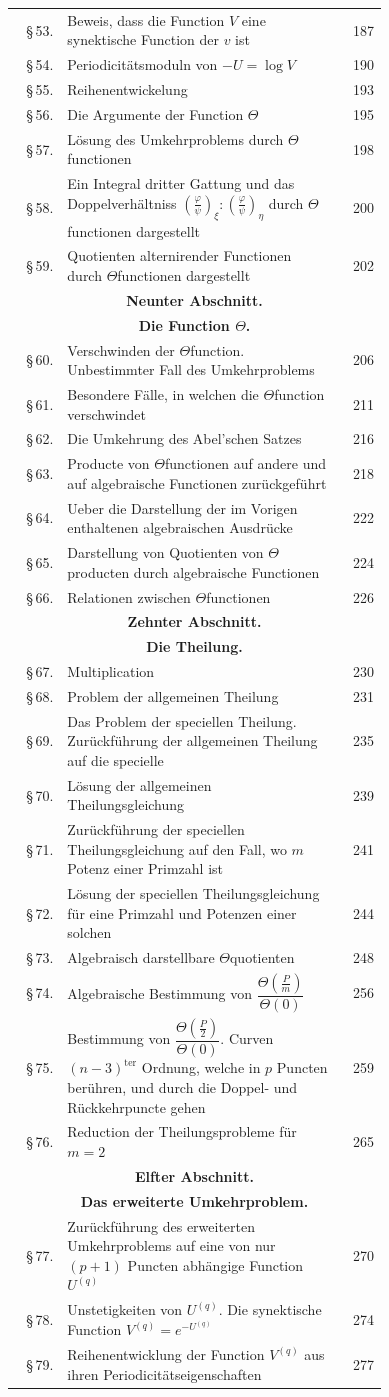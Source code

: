 \documentclass[10pt]{article}
\newcommand{\tocentry}[3]{\S\,#1 & #2 & #3\\}
\newcommand{\tocsec}[2]{\multicolumn{3}{c}{\bfseries #1}\\[-0.15em]\multicolumn{3}{c}{\bfseries #2}\\[0.25em]}
\begin{document}
{\begin{longtable}{@{}r@{\ }p{0.74\linewidth}@{\ }r@{}}
\tocentry{53.}{Beweis, dass die Function $V$ eine synektische Function der $v$ ist}{187}
\tocentry{54.}{Periodicitätsmoduln von $-U=\log V$}{190}
\tocentry{55.}{Reihenentwickelung}{193}
\tocentry{56.}{Die Argumente der Function $\Theta$}{195}
\tocentry{57.}{Lösung des Umkehrproblems durch $\Theta$functionen}{198}
\tocentry{58.}{Ein Integral dritter Gattung und das Doppelverhältniss $\left(\frac{\varphi}{\psi}\right)_{\xi}:\left(\frac{\varphi}{\psi}\right)_{\eta}$ durch $\Theta$functionen dargestellt}{200}
\tocentry{59.}{Quotienten alternirender Functionen durch $\Theta$functionen dargestellt}{202}
\tocsec{Neunter Abschnitt.}{Die Function $\Theta$.}
\tocentry{60.}{Verschwinden der $\Theta$function. Unbestimmter Fall des Umkehrproblems}{206}
\tocentry{61.}{Besondere Fälle, in welchen die $\Theta$function verschwindet}{211}
\tocentry{62.}{Die Umkehrung des Abel'schen Satzes}{216}
\tocentry{63.}{Producte von $\Theta$functionen auf andere und auf algebraische Functionen zurückgeführt}{218}
\tocentry{64.}{Ueber die Darstellung der im Vorigen enthaltenen algebraischen Ausdrücke}{222}
\tocentry{65.}{Darstellung von Quotienten von $\Theta$producten durch algebraische Functionen}{224}
\tocentry{66.}{Relationen zwischen $\Theta$functionen}{226}
\tocsec{Zehnter Abschnitt.}{Die Theilung.}
\tocentry{67.}{Multiplication}{230}
\tocentry{68.}{Problem der allgemeinen Theilung}{231}
\tocentry{69.}{Das Problem der speciellen Theilung. Zurückführung der allgemeinen Theilung auf die specielle}{235}
\tocentry{70.}{Lösung der allgemeinen Theilungsgleichung}{239}
\tocentry{71.}{Zurückführung der speciellen Theilungsgleichung auf den Fall, wo $m$ Potenz einer Primzahl ist}{241}
\tocentry{72.}{Lösung der speciellen Theilungsgleichung für eine Primzahl und Potenzen einer solchen}{244}
\tocentry{73.}{Algebraisch darstellbare $\Theta$quotienten}{248}
\tocentry{74.}{Algebraische Bestimmung von $\dfrac{\Theta\left(\frac{P}{m}\right)}{\Theta(0)}$}{256}
\tocentry{75.}{Bestimmung von $\dfrac{\Theta\left(\frac{P}{2}\right)}{\Theta(0)}$. Curven $(n-3)^{\mathrm{ter}}$ Ordnung, welche in $p$ Puncten berühren, und durch die Doppel- und Rückkehrpuncte gehen}{259}
\tocentry{76.}{Reduction der Theilungsprobleme für $m=2$}{265}
\tocsec{Elfter Abschnitt.}{Das erweiterte Umkehrproblem.}
\tocentry{77.}{Zurückführung des erweiterten Umkehrproblems auf eine von nur $(p+1)$ Puncten abhängige Function $U^{(q)}$}{270}
\tocentry{78.}{Unstetigkeiten von $U^{(q)}$. Die synektische Function $V^{(q)}=e^{-U^{(q)}}$}{274}
\tocentry{79.}{Reihenentwicklung der Function $V^{(q)}$ aus ihren Periodicitätseigenschaften}{277}

\end{longtable}}
\end{document}
